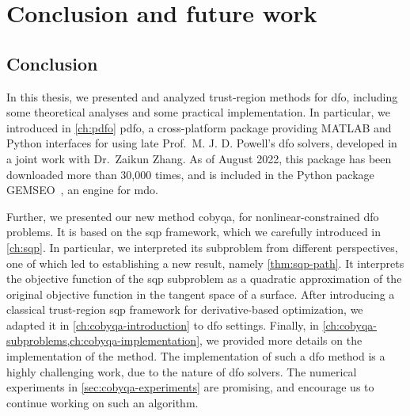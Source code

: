 %
%
%
\chapter{Conclusion and future work}
\label{ch:conclusion}

\section{Conclusion}

In this thesis, we presented and analyzed trust-region methods for \gls{dfo}, including some theoretical analyses and some practical implementation.
In particular, we introduced in \cref{ch:pdfo} \gls{pdfo}, a cross-platform package providing MATLAB and Python interfaces for using late Prof.\ M. J. D. Powell's \gls{dfo} solvers, developed in a joint work with Dr.\ Zaikun Zhang.
As of August 2022, this package has been downloaded more than 30,000 times, and is included in the Python package GEMSEO~\cite{Gallard_Etal_2018}, an engine for \gls{mdo}.

Further, we presented our new method \gls{cobyqa}, for nonlinear-constrained \gls{dfo} problems.
It is based on the \gls{sqp} framework, which we carefully introduced in \cref{ch:sqp}.
In particular, we interpreted its subproblem from different perspectives, one of which led to establishing a new result, namely \cref{thm:sqp-path}.
It interprets the objective function of the \gls{sqp} subproblem as a quadratic approximation of the original objective function in the tangent space of a surface.
After introducing a classical trust-region \gls{sqp} framework for derivative-based optimization, we adapted it in \cref{ch:cobyqa-introduction} to \gls{dfo} settings.
Finally, in \cref{ch:cobyqa-subproblems,ch:cobyqa-implementation}, we provided more details on the implementation of the method.
The implementation of such a \gls{dfo} method is a highly challenging work, due to the nature of \gls{dfo} solvers.
The numerical experiments in \cref{sec:cobyqa-experiments} are promising, and encourage us to continue working on such an algorithm.

